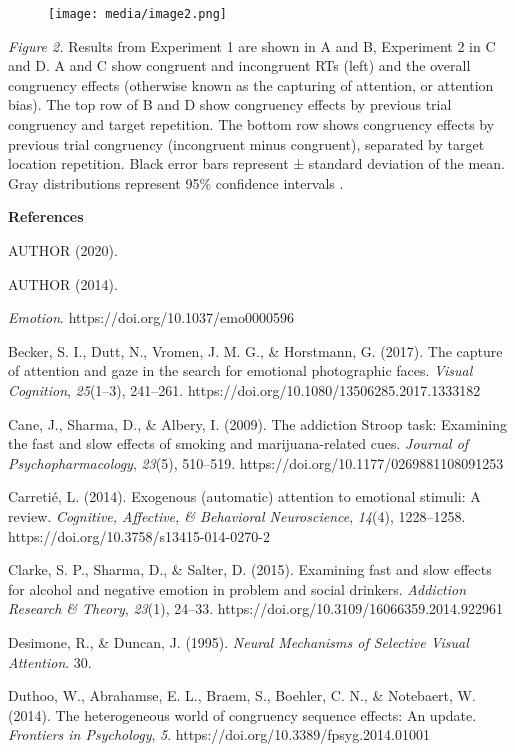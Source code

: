 \documentclass{article}
\begin{document}
\begin{figure}

  \texttt{[image: media/image2.png]}
\caption{}
\label{}


\end{figure}


\emph{Figure 2. }Results from Experiment 1 are shown in A and B, Experiment 2 in C and D. A and C show congruent and incongruent RTs (left) and the overall congruency effects (otherwise known as the capturing of attention, or attention bias). The top row of B and D show congruency effects by previous trial congruency and target repetition. The bottom row shows congruency effects by previous trial congruency (incongruent minus congruent), separated by target location repetition. Black error bars represent ± standard deviation of the mean. Gray distributions represent 95\% confidence intervals \parencite{Ho2019}. 



\textbf{References}

AUTHOR (2020). 

AUTHOR (2014). 

\emph{Emotion}. https://doi.org/10.1037/emo0000596

Becker, S. I., Dutt, N., Vromen, J. M. G., \& Horstmann, G. (2017). The capture of attention and gaze in the search for emotional photographic faces. \emph{Visual Cognition}, \emph{25}(1--3), 241--261. https://doi.org/10.1080/13506285.2017.1333182

Cane, J., Sharma, D., \& Albery, I. (2009). The addiction Stroop task: Examining the fast and slow effects of smoking and marijuana-related cues. \emph{Journal of Psychopharmacology}, \emph{23}(5), 510--519. https://doi.org/10.1177/0269881108091253

Carretié, L. (2014). Exogenous (automatic) attention to emotional stimuli: A review. \emph{Cognitive, Affective, \& Behavioral Neuroscience}, \emph{14}(4), 1228--1258. https://doi.org/10.3758/s13415-014-0270-2

Clarke, S. P., Sharma, D., \& Salter, D. (2015). Examining fast and slow effects for alcohol and negative emotion in problem and social drinkers. \emph{Addiction Research \& Theory}, \emph{23}(1), 24--33. https://doi.org/10.3109/16066359.2014.922961

Desimone, R., \& Duncan, J. (1995). \emph{Neural Mechanisms of Selective Visual Attention}. 30.

Duthoo, W., Abrahamse, E. L., Braem, S., Boehler, C. N., \& Notebaert, W. (2014). The heterogeneous world of congruency sequence effects: An update. \emph{Frontiers in Psychology}, \emph{5}. https://doi.org/10.3389/fpsyg.2014.01001
\end{document}
